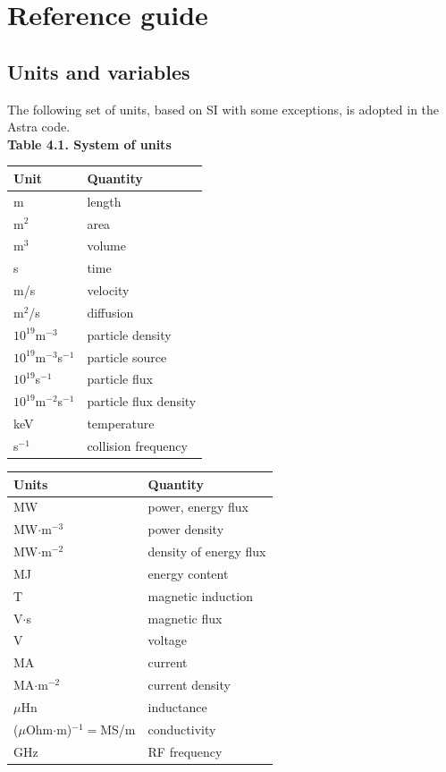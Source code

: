 
\section{Reference guide}

\subsection{Units and variables}

The following set of units, based on SI with some exceptions, is adopted
in the Astra code. 
\medskip\\
\noindent
{\bf Table 4.1. System of units}
\nopagebreak
\\[10pt]
\nopagebreak
\noindent
\begin{tabular}{|l|l|}
\hline
\bf Unit		& \bf Quantity\\
\hline
m			& length\\
m$^2$			& area\\
m$^3$			& volume\\
s			& time\\
m/s			& velocity\\
m$^2$/s			& diffusion\\
$10^{19}$m$^{-3}$	& particle density\\
$10^{19}$m$^{-3}$s$^{-1}$ & particle source\\
$10^{19}$s$^{-1}$	& particle flux\\
$10^{19}$m$^{-2}$s$^{-1}$ & particle flux density\\
keV			& temperature\\
s$^{-1}$		& collision frequency\\
\hline
\end{tabular}
\hspace*{30pt}\begin{tabular}{|l|l|}
\hline
\bf Units		& \bf Quantity\\
\hline
MW			& power, energy flux\\
MW$\cdot$m$^{-3}$	& power density\\
MW$\cdot$m$^{-2}$	& density of energy flux\\
MJ			& energy content\\
T			& magnetic induction\\
V$\cdot$s		& magnetic flux\\
V			& voltage\\
MA			& current\\
MA$\cdot$m$^{-2}$	& current density\\
$\mu$Hn			& inductance\\
($\mu$Ohm$\cdot$m)$^{-1}\!=$MS/m	& conductivity\\
GHz			& RF frequency\\
\hline
\end{tabular}
